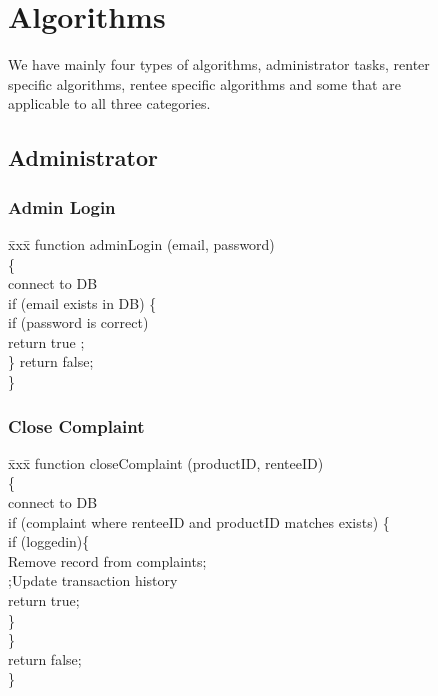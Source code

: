 \documentclass[11pt]{report}
\begin{document}
\begin{figure}[h]
\section{Algorithms}
We have mainly four types of algorithms, administrator tasks, renter specific algorithms, rentee specific algorithms and some that are applicable to all three categories.\\

\subsection{Administrator}
\subsubsection{Admin Login}
\begin{tabbing}
\= xxx\= \kill
function adminLogin (email, password)\\
\{\\
\hspace{0.3in}connect to DB\\
\hspace{0.3in}if (email exists in DB) \{\\
 \hspace{0.6in}if (password is correct)\\ 
\hspace{1.2in}return true ;\\
\hspace{0.3in} \}
\hspace{0.3in}return false;\\
\}
\end{tabbing}
\subsubsection{Close Complaint}
\begin{tabbing}
\= xxx\= \kill
function closeComplaint (productID, renteeID)\\
\{\\
\hspace{0.3in}connect to DB\\
\hspace{0.3in}if (complaint where renteeID and productID matches exists) \{\\
 \hspace{0.6in}if (loggedin)\{\\ 
\hspace{1.2in}Remove record from complaints;\\
\hspace{1.2in};Update transaction history\\
\hspace{1.2in}return true;\\
\hspace{0.6in} \}\\
\hspace{0.3in} \}\\
\hspace{0.3in}return false;\\
\}
\end{tabbing}
\end{figure}
\end{document}
